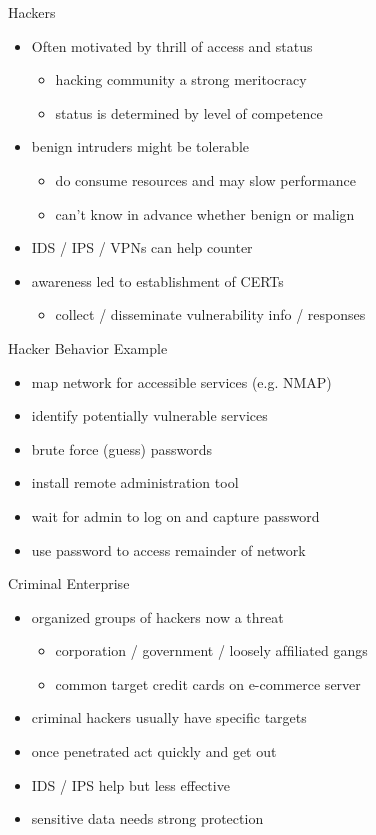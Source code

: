 \documentclass{beamer}
\begin{document}
\begin{frame}{Hackers}
  \begin{itemize}
  \item Often motivated by thrill of access and status 
    \begin{itemize}
    \item hacking community a strong meritocracy 
    \item status is determined by level of competence 
    \end{itemize}
  \item benign intruders might be tolerable 
    \begin{itemize}
    \item do consume resources and may slow performance 
    \item can't know in advance whether benign or malign 
    \end{itemize}
  \item IDS / IPS / VPNs can help counter 
  \item awareness led to establishment of CERTs 
    \begin{itemize}
    \item collect / disseminate vulnerability info / responses 
    \end{itemize}
  \end{itemize}
\end{frame}

\begin{frame}{Hacker Behavior Example}
  \begin{itemize}
  \item map network for accessible services  (e.g. NMAP)
  \item identify potentially vulnerable services 
  \item brute force (guess) passwords
  \item install remote administration tool 
  \item wait for admin to log on and capture password
  \item use password to access remainder of network
  \end{itemize}
\end{frame}

\begin{frame}{Criminal Enterprise}
  \begin{itemize}
  \item \alert{organized} groups of hackers now a threat
    \begin{itemize}
    \item corporation / government / loosely afﬁliated gangs
    \item common target credit cards on e-commerce server
    \end{itemize}
  \item criminal hackers usually have speciﬁc targets
  \item once penetrated act quickly and get out
  \item IDS / IPS help but less effective 
  \item sensitive data needs strong protection
  \end{itemize}
\end{frame}
\end{document}
